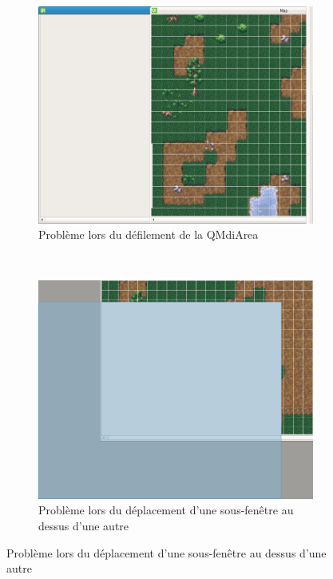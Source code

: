 \begin{figure}[h!]
        \centering
        \begin{subfigure}[h!]{0.5\textwidth}
                \includegraphics[width=\textwidth]{img/sfml_traceBug.png}
				\caption{Problème lors du défilement de la QMdiArea}
				\label{fig:sfml_tracebug}
        \end{subfigure}%
    	~
        \begin{subfigure}[h!]{0.5\textwidth}
                \includegraphics[width=\textwidth]{img/sfml_movementBug.png}
                \caption{Problème lors du déplacement d'une sous-fenêtre au dessus d'une autre}
				\label{fig:sfml_movementbug}
        \end{subfigure}
\end{figure}

